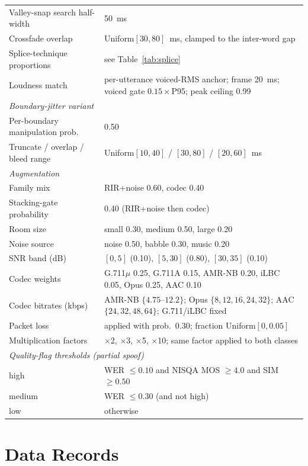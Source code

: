 \documentclass[11pt]{article}
\begin{document}
\begin{table}[t]
\begin{tabular}{p{4.9cm}p{6.6cm}}
Valley-snap search half-width & \SI{50}{\milli\second} \\
Crossfade overlap & Uniform$[30,80]$~ms, clamped to the inter-word gap \\
Splice-technique proportions & see Table~\ref{tab:splice} \\
Loudness match & per-utterance voiced-RMS anchor; frame \SI{20}{\milli\second}; voiced gate $0.15\times$P95; peak ceiling 0.99 \\
\midrule
\multicolumn{2}{l}{\emph{Boundary-jitter variant}} \\
\midrule
Per-boundary manipulation prob. & 0.50 \\
Truncate / overlap / bleed range & Uniform$[10,40]$ / $[30,80]$ / $[20,60]$~ms \\
\midrule
\multicolumn{2}{l}{\emph{Augmentation}} \\
\midrule
Family mix & RIR+noise 0.60, codec 0.40 \\
Stacking-gate probability & 0.40 (RIR+noise then codec) \\
Room size & small 0.30, medium 0.50, large 0.20 \\
Noise source & noise 0.50, babble 0.30, music 0.20 \\
SNR band (dB) & $[0,5]$ (0.10), $[5,30]$ (0.80), $[30,35]$ (0.10) \\
Codec weights & G.711$\mu$ 0.25, G.711A 0.15, AMR-NB 0.20, iLBC 0.05, Opus 0.25, AAC 0.10 \\
Codec bitrates (kbps) & AMR-NB $\{4.75\text{--}12.2\}$; Opus $\{8,12,16,24,32\}$; AAC $\{24,32,48,64\}$; G.711/iLBC fixed \\
Packet loss & applied with prob.\ 0.30; fraction Uniform$[0,0.05]$ \\
Multiplication factors & $\times$2, $\times$3, $\times$5, $\times$10; same factor applied to both classes \\
\midrule
\multicolumn{2}{l}{\emph{Quality-flag thresholds (partial spoof)}} \\
\midrule
high & WER $\leq 0.10$ and NISQA MOS $\geq 4.0$ and SIM $\geq 0.50$ \\
medium & WER $\leq 0.30$ (and not high) \\
low & otherwise \\
\bottomrule
\end{tabular}
\end{table}

\section*{Data Records}
\end{document}
